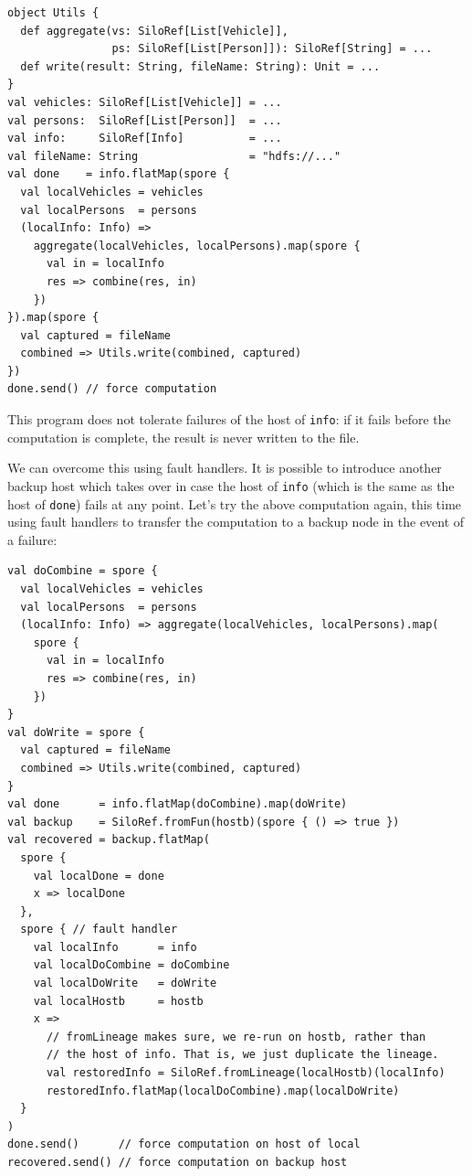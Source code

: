 \documentclass{jfp1}
\begin{document}
\vspace{-0.8mm}
\begin{lstlisting}
object Utils {
  def aggregate(vs: SiloRef[List[Vehicle]],
                ps: SiloRef[List[Person]]): SiloRef[String] = ...
  def write(result: String, fileName: String): Unit = ...
}
val vehicles: SiloRef[List[Vehicle]] = ...
val persons:  SiloRef[List[Person]]  = ...
val info:     SiloRef[Info]          = ...
val fileName: String                 = "hdfs://..."
val done    = info.flatMap(spore {
  val localVehicles = vehicles
  val localPersons  = persons
  (localInfo: Info) =>
    aggregate(localVehicles, localPersons).map(spore {
      val in = localInfo
      res => combine(res, in)
    })
}).map(spore {
  val captured = fileName
  combined => Utils.write(combined, captured)
})
done.send() // force computation
\end{lstlisting}
\noindent
This program does not tolerate failures of the host of \verb|info|: if it fails
before the computation is complete, the result is never written to the file.

We can overcome this using fault handlers. It is possible to introduce another
backup host which takes over in case the host of \verb|info| (which is the same
as the host of \verb|done|) fails at any point. Let's try the above computation
again, this time using fault handlers to transfer the computation to a backup
node in the event of a failure:

\begin{lstlisting}
val doCombine = spore {
  val localVehicles = vehicles
  val localPersons  = persons
  (localInfo: Info) => aggregate(localVehicles, localPersons).map(
    spore {
      val in = localInfo
      res => combine(res, in)
    })
}
val doWrite = spore {
  val captured = fileName
  combined => Utils.write(combined, captured)
}
val done      = info.flatMap(doCombine).map(doWrite)
val backup    = SiloRef.fromFun(hostb)(spore { () => true })
val recovered = backup.flatMap(
  spore {
    val localDone = done
    x => localDone
  },
  spore { // fault handler
    val localInfo      = info
    val localDoCombine = doCombine
    val localDoWrite   = doWrite
    val localHostb     = hostb
    x =>
      // fromLineage makes sure, we re-run on hostb, rather than
      // the host of info. That is, we just duplicate the lineage.
      val restoredInfo = SiloRef.fromLineage(localHostb)(localInfo)
      restoredInfo.flatMap(localDoCombine).map(localDoWrite)
  }
)
done.send()      // force computation on host of local
recovered.send() // force computation on backup host
\end{lstlisting}
\noindent
\end{document}
